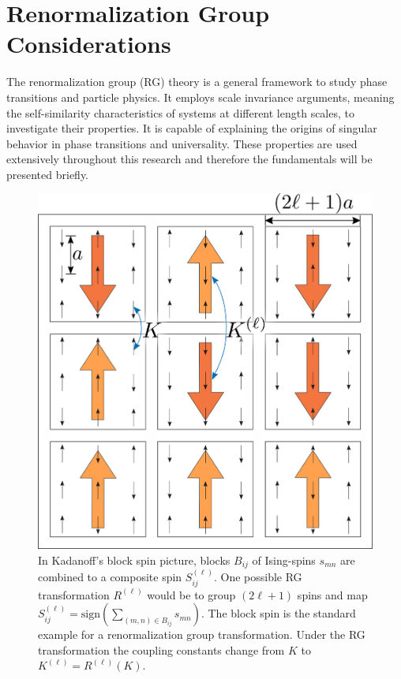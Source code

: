 	\section{Renormalization Group Considerations} \label{Section::RG}
	The renormalization group (RG) theory is a general framework to study phase transitions and particle physics. It employs scale invariance arguments, meaning the self-similarity characteristics of systems at different length scales, to investigate their properties. It is capable of explaining the origins of singular behavior in phase transitions and universality. These properties are used extensively throughout this research and therefore the fundamentals will be presented briefly.\\
	\begin{figure}[t]
		\centering
		\includegraphics[width=0.7\linewidth]{graphics/RG-Iteration-4.png}
		\caption{In Kadanoff's block spin picture,  blocks $B_{ij}$ of Ising-spins $s_{mn}$ are combined to a composite spin $S^{(\ell)}_{ij}$. One possible RG transformation $R^{(\ell)}$ would be to group $(2\ell + 1)$ spins and map $S^{(\ell)}_{ij} =	\text{sign}\left(\sum_{(m,n) \in B_{ij}} s_{mn} \right)$. The block spin is the standard example for a renormalization group transformation. Under the RG transformation the coupling constants change from $K$ to $K^{(\ell)} =	R^{(\ell)}(K)$.}
		\label{Fig::RG-Iteration}
	\end{figure}
	
